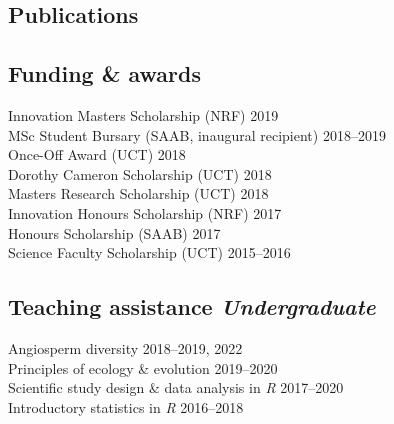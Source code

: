\documentclass[10pt]{article}
\begin{document}


\bigskip



\subsection*{Publications} %



\hrulefill

\begin{multicols}{2} %

\subsection*{Funding \& awards} %

Innovation Masters Scholarship     {\small  (NRF)} \hfill {\small       2019} \\
MSc Student Bursary
              {\small (SAAB, inaugural recipient)} \hfill {\small 2018--2019} \\
Once-Off Award                     {\small  (UCT)} \hfill {\small       2018} \\
Dorothy Cameron Scholarship        {\small  (UCT)} \hfill {\small       2018} \\
Masters Research Scholarship       {\small  (UCT)} \hfill {\small       2018} \\
Innovation Honours Scholarship     {\small  (NRF)} \hfill {\small       2017} \\
Honours Scholarship                {\small (SAAB)} \hfill {\small       2017} \\
Science Faculty Scholarship        {\small  (UCT)} \hfill {\small 2015--2016}

\subsection*{Teaching assistance %
                                \hfill {\small \textmd{\textit{Undergraduate}}}}

Angiosperm diversity                         \hfill {\small 2018--2019, 2022} \\
Principles of ecology \& evolution           \hfill {\small       2019--2020} \\
Scientific study design \& data analysis in \textit{R}
                                             \hfill {\small       2017--2020} \\
Introductory statistics in \textit{R} \hfill {\small 2016--2018}


\end{multicols}
\end{document}
